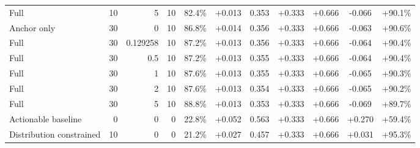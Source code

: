 \begin{table}[htbp]
\begin{tabular}{lrrrccccccc}
Full & 10 & 5 & 10 & 82.4\% & +0.013 & 0.353 & +0.333 & +0.666 & -0.066 & +90.1\% \\
Anchor only & 30 & 0 & 10 & 86.8\% & +0.014 & 0.356 & +0.333 & +0.666 & -0.063 & +90.6\% \\
Full & 30 & 0.129258 & 10 & 87.2\% & +0.013 & 0.356 & +0.333 & +0.666 & -0.064 & +90.4\% \\
Full & 30 & 0.5 & 10 & 87.2\% & +0.013 & 0.355 & +0.333 & +0.666 & -0.064 & +90.4\% \\
Full & 30 & 1 & 10 & 87.6\% & +0.013 & 0.355 & +0.333 & +0.666 & -0.065 & +90.3\% \\
Full & 30 & 2 & 10 & 87.6\% & +0.013 & 0.354 & +0.333 & +0.666 & -0.065 & +90.2\% \\
Full & 30 & 5 & 10 & 88.8\% & +0.013 & 0.353 & +0.333 & +0.666 & -0.069 & +89.7\% \\
Actionable baseline & 0 & 0 & 0 & 22.8\% & +0.052 & 0.563 & +0.333 & +0.666 & +0.270 & +59.4\% \\
Distribution constrained & 10 & 0 & 0 & 21.2\% & +0.027 & 0.457 & +0.333 & +0.666 & +0.031 & +95.3\% \\
\bottomrule
\end{tabular}
\end{table}